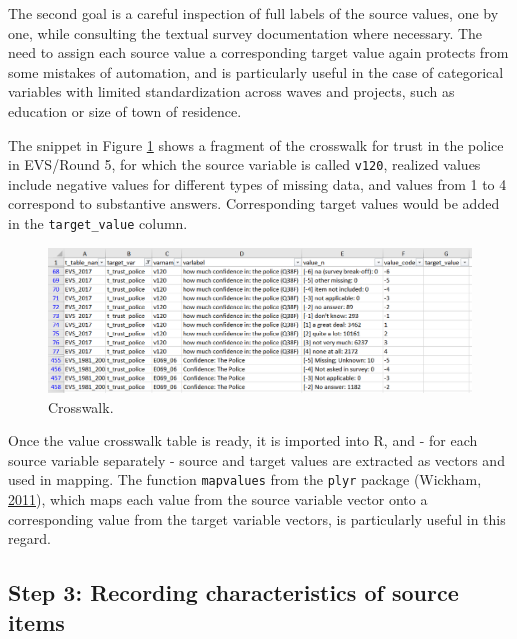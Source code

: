 \documentclass[12pt,]{article}
\begin{document}
The second goal is a careful inspection of full labels of the source values, one by one, while consulting the textual survey documentation where necessary. The need to assign each source value a corresponding target value again protects from some mistakes of automation, and is particularly useful in the case of categorical variables with limited standardization across waves and projects, such as education or size of town of residence.

The snippet in Figure \ref{fig:cwt} shows a fragment of the crosswalk for trust in the police in EVS/Round 5, for which the source variable is called \texttt{v120}, realized values include negative values for different types of missing data, and values from 1 to 4 correspond to substantive answers. Corresponding target values would be added in the \texttt{target\_value} column.

\begin{figure}[H]
\includegraphics[width=465px]{pictures/cwt_empty} \caption{Crosswalk.}\label{fig:cwt}
\end{figure}

Once the value crosswalk table is ready, it is imported into R, and - for each source variable separately - source and target values are extracted as vectors and used in mapping. The function \texttt{mapvalues} from the \texttt{plyr} package (Wickham, \protect\hyperlink{ref-Wickham2011}{2011}), which maps each value from the source variable vector onto a corresponding value from the target variable vectors, is particularly useful in this regard.

\hypertarget{step-3-recording-characteristics-of-source-items}{%
\subsection{Step 3: Recording characteristics of source items}\label{step-3-recording-characteristics-of-source-items}}
\end{document}
